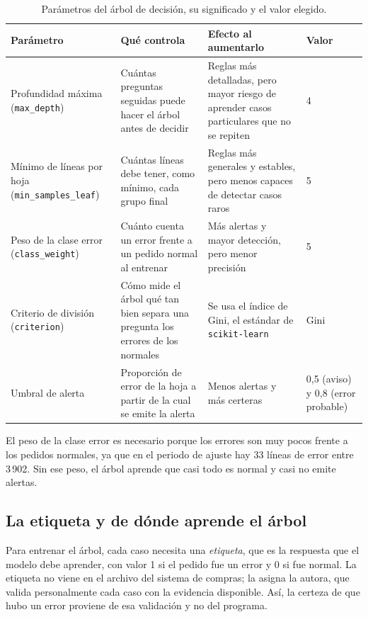 \begin{table}[htbp]
\centering
\caption{Parámetros del árbol de decisión, su significado y el valor elegido.}
\label{tab:parametros-arbol}
\footnotesize
\begin{tabularx}{\textwidth}{@{}L{2.5cm}YYL{1.5cm}@{}}
\toprule
\textbf{Parámetro} & \textbf{Qué controla} & \textbf{Efecto al aumentarlo} & \textbf{Valor} \\
\midrule
Profundidad máxima (\texttt{max\_depth}) & Cuántas preguntas seguidas puede hacer el árbol antes de decidir & Reglas más detalladas, pero mayor riesgo de aprender casos particulares que no se repiten & 4 \\
Mínimo de líneas por hoja (\texttt{min\_samples\_leaf}) & Cuántas líneas debe tener, como mínimo, cada grupo final & Reglas más generales y estables, pero menos capaces de detectar casos raros & 5 \\
Peso de la clase error (\texttt{class\_weight}) & Cuánto cuenta un error frente a un pedido normal al entrenar & Más alertas y mayor detección, pero menor precisión & 5 \\
Criterio de división (\texttt{criterion}) & Cómo mide el árbol qué tan bien separa una pregunta los errores de los normales & Se usa el índice de Gini, el estándar de \texttt{scikit-learn} & Gini \\
Umbral de alerta & Proporción de error de la hoja a partir de la cual se emite la alerta & Menos alertas y más certeras & 0,5 (aviso) y 0,8 (error probable) \\
\bottomrule
\end{tabularx}
\end{table}

El peso de la clase error es necesario porque los errores son muy pocos frente a los pedidos normales, ya que en el periodo de ajuste hay 33 líneas de error entre 3\,902. Sin ese peso, el árbol aprende que casi todo es normal y casi no emite alertas.

\subsection{La etiqueta y de dónde aprende el árbol}
\label{sec:etiqueta}

Para entrenar el árbol, cada caso necesita una \emph{etiqueta}, que es la respuesta que el modelo debe aprender, con valor 1 si el pedido fue un error y 0 si fue normal. La etiqueta no viene en el archivo del sistema de compras; la asigna la autora, que valida personalmente cada caso con la evidencia disponible. Así, la certeza de que hubo un error proviene de esa validación y no del programa.

